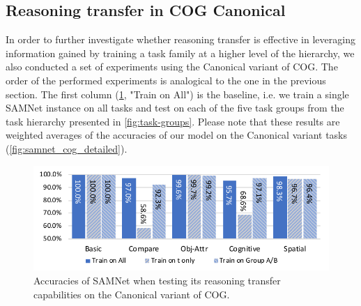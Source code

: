 



\subsection{Reasoning transfer in COG Canonical}
\label{sec:reasoning-transfer-cog}
In order to further investigate whether reasoning transfer is effective in leveraging information gained by training a task family at a higher level of the hierarchy, we also conducted a set of experiments using the Canonical variant of COG.
The order of the performed experiments is analogical to the one in the previous section.
The first column (\cref{fig:cog_reasoning_transfer}, "Train on All") is the baseline, i.e.
we train a single SAMNet instance on all tasks and test on each of the five task groups from the task hierarchy presented in \cref{fig:task-groups}.
Please note that these results are weighted averages of the accuracies of our model on the Canonical variant tasks (\cref{fig:samnet_cog_detailed}).

\begin{figure}[htbp]
	\centering
	\includegraphics[width=\textwidth]{../img/plots/cog_reasoning_transfer.pdf}
	\caption{Accuracies of SAMNet when testing its reasoning transfer capabilities on the Canonical variant of COG.}
	\label{fig:cog_reasoning_transfer}
\end{figure}


